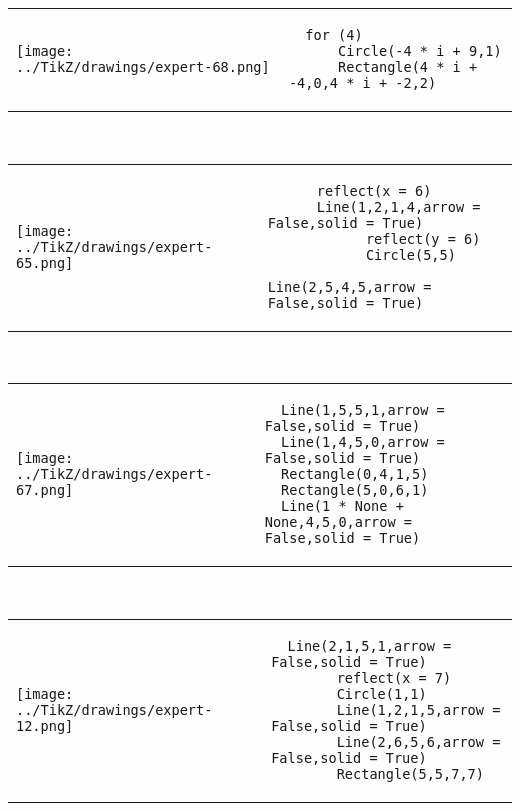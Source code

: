         \begin{tabular}{ll}
\texttt{[image: ../TikZ/drawings/expert-68.png]}&
        \begin{minipage}{10cm}
        \begin{verbatim}
  for (4)
      Circle(-4 * i + 9,1)
      Rectangle(4 * i + -4,0,4 * i + -2,2)
        \end{verbatim}
\end{minipage}
\end{tabular}        
        \\

        \begin{tabular}{ll}
\texttt{[image: ../TikZ/drawings/expert-65.png]}&
        \begin{minipage}{10cm}
        \begin{verbatim}
      reflect(x = 6)
      Line(1,2,1,4,arrow = False,solid = True)
            reflect(y = 6)
            Circle(5,5)
            Line(2,5,4,5,arrow = False,solid = True)
        \end{verbatim}
\end{minipage}
\end{tabular}        
        \\

        \begin{tabular}{ll}
\texttt{[image: ../TikZ/drawings/expert-67.png]}&
        \begin{minipage}{10cm}
        \begin{verbatim}
  Line(1,5,5,1,arrow = False,solid = True)
  Line(1,4,5,0,arrow = False,solid = True)
  Rectangle(0,4,1,5)
  Rectangle(5,0,6,1)
  Line(1 * None + None,4,5,0,arrow = False,solid = True)
        \end{verbatim}
\end{minipage}
\end{tabular}        
        \\

        \begin{tabular}{ll}
\texttt{[image: ../TikZ/drawings/expert-12.png]}&
        \begin{minipage}{10cm}
        \begin{verbatim}
  Line(2,1,5,1,arrow = False,solid = True)
        reflect(x = 7)
        Circle(1,1)
        Line(1,2,1,5,arrow = False,solid = True)
        Line(2,6,5,6,arrow = False,solid = True)
        Rectangle(5,5,7,7)
        \end{verbatim}
\end{minipage}
\end{tabular}        
        \\

